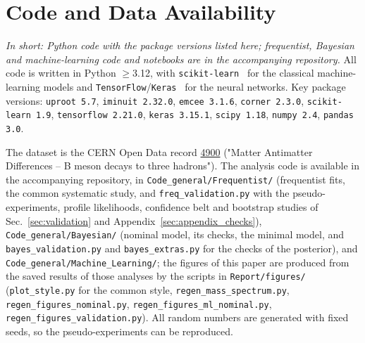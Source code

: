 \section{Code and Data Availability}
\label{sec:code}
\emph{In short: Python code with the package versions listed here; frequentist, Bayesian and machine-learning code and notebooks are in the accompanying repository.}
All code is written in Python $\geq$3.12, with \texttt{scikit-learn}~\cite{sklearn} for the classical machine-learning models and \texttt{TensorFlow}/\texttt{Keras}~\cite{tensorflow} for the neural networks. Key package versions: \texttt{uproot 5.7}, \texttt{iminuit 2.32.0}, \texttt{emcee 3.1.6}, \texttt{corner 2.3.0}, \texttt{scikit-learn 1.9}, \texttt{tensorflow 2.21.0}, \texttt{keras 3.15.1}, \texttt{scipy 1.18}, \texttt{numpy 2.4}, \texttt{pandas 3.0}.

The dataset is the CERN Open Data record \href{https://opendata.cern.ch/record/4900}{4900} ("Matter Antimatter Differences -- B meson decays to three hadrons"). The analysis code is available in the accompanying repository, in \texttt{Code\_general/Frequentist/} (frequentist fits, the common systematic study, and \texttt{freq\_validation.py} with the pseudo-experiments, profile likelihoods, confidence belt and bootstrap studies of Sec.~\ref{sec:validation} and Appendix~\ref{sec:appendix_checks}), \texttt{Code\_general/Bayesian/} (nominal model, its checks, the minimal model, and \texttt{bayes\_validation.py} and \texttt{bayes\_extras.py} for the checks of the posterior), and \texttt{Code\_general/Machine\_Learning/}; the figures of this paper are produced from the saved results of those analyses by the scripts in \texttt{Report/figures/} (\texttt{plot\_style.py} for the common style, \texttt{regen\_mass\_spectrum.py}, \texttt{regen\_figures\_nominal.py}, \texttt{regen\_figures\_ml\_nominal.py}, \texttt{regen\_figures\_validation.py}). All random numbers are generated with fixed seeds, so the pseudo-experiments can be reproduced.
